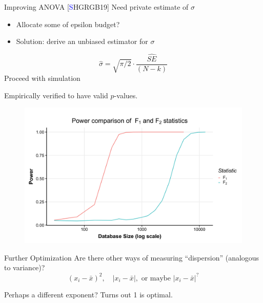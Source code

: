\documentclass{beamer}
\begin{document}
\begin{frame}{Improving ANOVA [\textcolor{blue}{S}HGRGB19]}
Need private estimate of $\sigma$ \pause
\begin{itemize}
	\item Allocate some of epsilon budget? \pause
	\item Solution: derive an unbiased estimator for $\sigma$ \pause
\end{itemize}
\bigskip

$$\hat{\sigma} = \sqrt{\pi/2} \cdot \frac{\widehat{SE}}{(N-k)} $$ \pause
\bigskip
Proceed with simulation
\bigskip

Empirically verified to have valid $p$-values.
\end{frame}


\begin{frame}{}
  \begin{figure}
  \includegraphics[scale=0.12]{images/f1-vs-f2}
  \end{figure}

\end{frame}

\begin{frame}{Further Optimization}
\pause
Are there other ways of measuring ``dispersion'' (analogous to variance)? 
$$(x_i - \bar{x})^2, \quad \lvert x_i - \bar{x} \rvert, \text{ or maybe }\lvert x_i - \bar{x} \rvert^?$$  \pause

Perhaps a different exponent? \pause Turns out 1 is optimal.
\end{frame}
\end{document}
